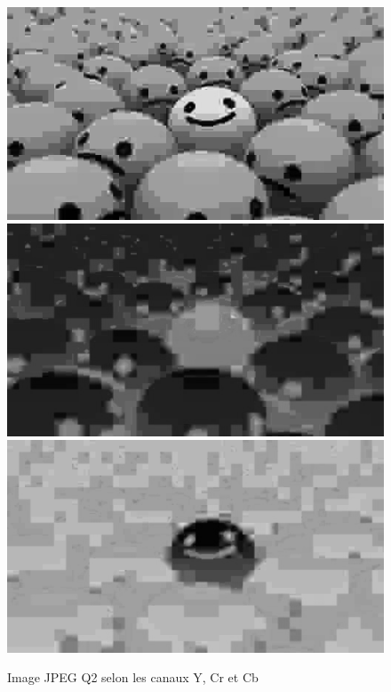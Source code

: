 \documentclass[12pt]{report}
\begin{document}
\begin{figure}[H]
\begin{center}
\includegraphics[scale=0.25]{../ImageRes/Image3_channel_0.jpg} 
\includegraphics[scale=0.25]{../ImageRes/Image3_channel_1.jpg} 
\includegraphics[scale=0.25]{../ImageRes/Image3_channel_2.jpg} 
\caption{Image JPEG Q2 selon les canaux Y, Cr et Cb}
\end{center}
\end{figure}
\end{document}
